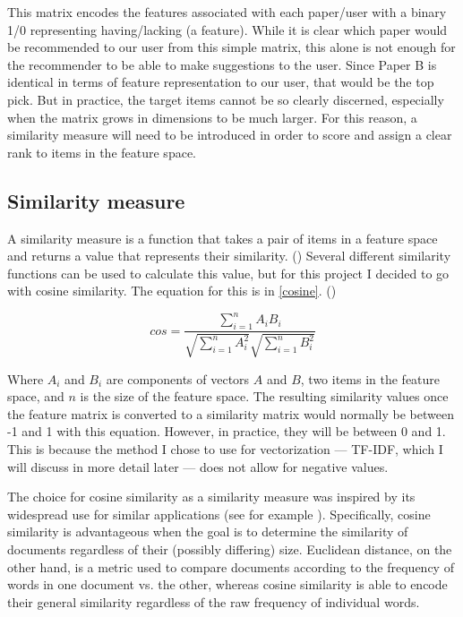 \documentclass{article}
\begin{document}
This matrix encodes the features associated with each paper/user with a binary 1/0 representing having/lacking (a feature). While it is clear which paper would be recommended to our user from this simple matrix, this alone is not enough for the recommender to be able to make suggestions to the user. Since Paper B is identical in terms of feature representation to our user, that would be the top pick. But in practice, the target items cannot be so clearly discerned, especially when the matrix grows in dimensions to be much larger. For this reason, a similarity measure will need to be introduced in order to score and assign a clear rank to items in the feature space.

\subsection{Similarity measure}
A similarity measure is a function that takes a pair of items in a feature space and returns a value that represents their similarity. (\cite{google}) Several different similarity functions can be used to calculate this value, but for this project I decided to go with cosine similarity. The equation for this is in \ref{cosine}. (\cite{cosinesimilarity})

\begin{exe}
\ex
\label{cosine}
\begin{equation*}
cos= \frac{\sum_{i=1}^{n} A_{i} B_{i}}{\sqrt{\sum_{i=1}^{n} A_{i}^2}\sqrt{\sum_{i=1}^{n} B_{i}^2}}
\end{equation*}
\end{exe}

Where $A_{i}$ and $B_{i}$ are components of vectors $A$ and $B$, two items in the feature space, and $n$ is the size of the feature space. The resulting similarity values once the feature matrix is converted to a similarity matrix would normally be between -1 and 1 with this equation. However, in practice, they will be between 0 and 1. This is because the method I chose to use for vectorization — TF-IDF, which I will discuss in more detail later — does not allow for negative values.    

The choice for cosine similarity as a similarity measure was inspired by its widespread use for similar applications (see for example \cite{tutorial}). Specifically, cosine similarity is advantageous when the goal is to determine the similarity of documents regardless of their (possibly differing) size. Euclidean distance, on the other hand, is a metric used to compare documents according to the frequency of words in one document vs. the other, whereas cosine similarity is able to encode their general similarity regardless of the raw frequency of individual words.
\end{document}
